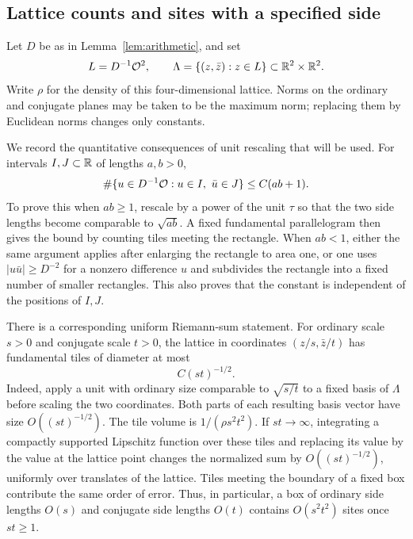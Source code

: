 \subsection{Lattice counts and sites with a specified side}

Let $D$ be as in Lemma~\ref{lem:arithmetic}, and set
\[
 L=D^{-1}\mathcal O^2,
 \qquad
 \Lambda=\{(z,\bar z):z\in L\}\subset\mathbb R^2\times\mathbb R^2.
\]
Write $\rho$ for the density of this four-dimensional lattice.  Norms on the
ordinary and conjugate planes may be taken to be the maximum norm; replacing
them by Euclidean norms changes only constants.

We record the quantitative consequences of unit rescaling that will be used.
For intervals $I,J\subset\mathbb R$ of lengths $a,b>0$,
\begin{equation}\label{eq:am-one-count}
 \#\{u\in D^{-1}\mathcal O:u\in I,\ \bar u\in J\}\le C(ab+1).
\end{equation}
To prove this when $ab\ge1$, rescale by a power of the unit $\tau$ so that
the two side lengths become comparable to $\sqrt{ab}$.  A fixed fundamental
parallelogram then gives the bound by counting tiles meeting the rectangle.
When $ab<1$, either the same argument applies after enlarging the rectangle
to area one, or one uses
$|u\bar u|\ge D^{-2}$ for a nonzero difference $u$ and subdivides the
rectangle into a fixed number of smaller rectangles.  This also proves that
the constant is independent of the positions of $I,J$.

There is a corresponding uniform Riemann-sum statement.  For ordinary scale
$s>0$ and conjugate scale $t>0$, the lattice in coordinates $(z/s,\bar z/t)$
has fundamental tiles of diameter at most
\begin{equation}\label{eq:am-tile}
 C(st)^{-1/2}.
\end{equation}
Indeed, apply a unit with ordinary size comparable to $\sqrt{s/t}$ to a
fixed basis of $\Lambda$ before scaling the two coordinates.  Both parts of
each resulting basis vector have size $O((st)^{-1/2})$.  The tile volume is
$1/(\rho s^2t^2)$.  If $st\to\infty$, integrating a compactly supported
Lipschitz function over these tiles and replacing its value by the value at
the lattice point changes the normalized sum by
$O((st)^{-1/2})$, uniformly over translates of the lattice.  Tiles meeting
the boundary of a fixed box contribute the same order of error.  Thus, in
particular, a box of ordinary side lengths $O(s)$ and conjugate side lengths
$O(t)$ contains $O(s^2t^2)$ sites once $st\ge1$.

